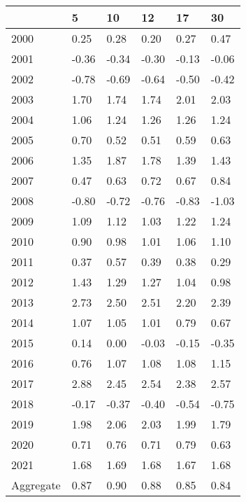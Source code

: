 \begin{tabular}{llllll}
\toprule
 & 5 & 10 & 12 & 17 & 30 \\
\midrule
2000 & 0.25 & 0.28 & 0.20 & 0.27 & 0.47 \\
2001 & -0.36 & -0.34 & -0.30 & -0.13 & -0.06 \\
2002 & -0.78 & -0.69 & -0.64 & -0.50 & -0.42 \\
2003 & 1.70 & 1.74 & 1.74 & 2.01 & 2.03 \\
2004 & 1.06 & 1.24 & 1.26 & 1.26 & 1.24 \\
2005 & 0.70 & 0.52 & 0.51 & 0.59 & 0.63 \\
2006 & 1.35 & 1.87 & 1.78 & 1.39 & 1.43 \\
2007 & 0.47 & 0.63 & 0.72 & 0.67 & 0.84 \\
2008 & -0.80 & -0.72 & -0.76 & -0.83 & -1.03 \\
2009 & 1.09 & 1.12 & 1.03 & 1.22 & 1.24 \\
2010 & 0.90 & 0.98 & 1.01 & 1.06 & 1.10 \\
2011 & 0.37 & 0.57 & 0.39 & 0.38 & 0.29 \\
2012 & 1.43 & 1.29 & 1.27 & 1.04 & 0.98 \\
2013 & 2.73 & 2.50 & 2.51 & 2.20 & 2.39 \\
2014 & 1.07 & 1.05 & 1.01 & 0.79 & 0.67 \\
2015 & 0.14 & 0.00 & -0.03 & -0.15 & -0.35 \\
2016 & 0.76 & 1.07 & 1.08 & 1.08 & 1.15 \\
2017 & 2.88 & 2.45 & 2.54 & 2.38 & 2.57 \\
2018 & -0.17 & -0.37 & -0.40 & -0.54 & -0.75 \\
2019 & 1.98 & 2.06 & 2.03 & 1.99 & 1.79 \\
2020 & 0.71 & 0.76 & 0.71 & 0.79 & 0.63 \\
2021 & 1.68 & 1.69 & 1.68 & 1.67 & 1.68 \\
Aggregate & 0.87 & 0.90 & 0.88 & 0.85 & 0.84 \\
\bottomrule
\end{tabular}

